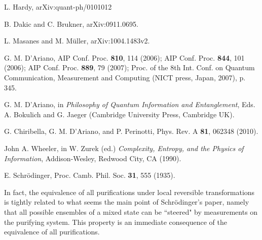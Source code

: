 \documentclass[12pt,aps,pra,showpacs,groupedaddress]{revtex4-1}
\begin{document}
\begin{thebibliography}{99}
 L. Hardy,  arXiv:quant-ph/0101012 

 B. Dakic and C.  Brukner,  arXiv:0911.0695.

 L. Masanes and M. M\"uller, arXiv:1004.1483v2. 


 G. M. D'Ariano, AIP Conf. Proc. {\bf 810}, 114 (2006); AIP Conf. Proc.  {\bf
    844}, 101 (2006); AIP Conf. Proc. {\bf 889}, 79 (2007); Proc. of the 8th Int. Conf. on Quantum
  Communication, Measurement and Computing (NICT press, Japan, 2007), p. 345.
  
 G. M. D'Ariano, in \emph{Philosophy of Quantum Information and Entanglement},
  Eds. A. Bokulich and G. Jaeger (Cambridge University Press, Cambridge UK).
  
  
 G. Chiribella, G. M. D'Ariano, and P.  Perinotti, Phys.  Rev. A {\bf 81},
  062348 (2010).

 John A. Wheeler, in W. Zurek (ed.) \emph{Complexity, Entropy, and the Physics of Information},  Addison-Wesley, Redwood City, CA (1990).

 E. Schr\"odinger, Proc. Camb. Phil. Soc. {\bf 31}, 555 (1935).

  In fact, the equivalence of all purifications under local reversible
  transformations is tightly related to what seems the main point of Schr\"odinger's paper, namely
  that all possible ensembles of a mixed state can be ``steered" by measurements on the purifying
  system.  This property is an immediate consequence of the
  equivalence of all purifications.


\end{thebibliography}
\end{document}
